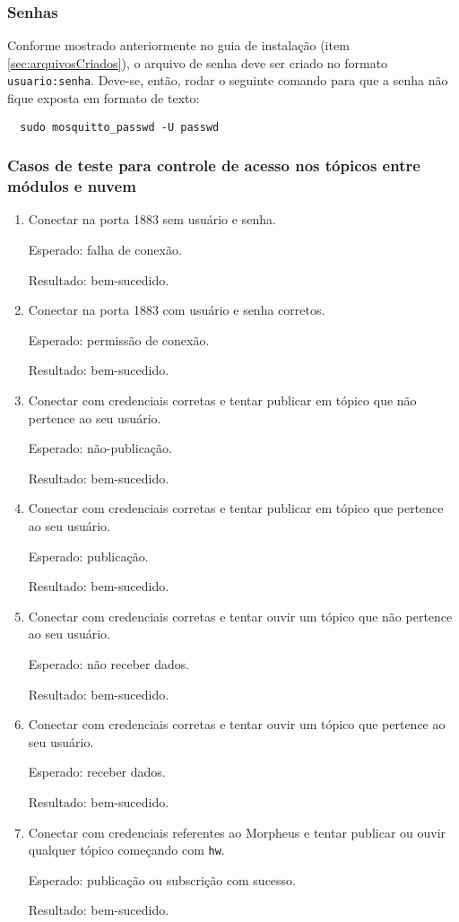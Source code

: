 \subsubsection{Senhas}

Conforme mostrado anteriormente no guia de instalação (item \ref{sec:arquivosCriados}), o arquivo de senha deve ser criado no formato \lstinline{usuario:senha}. Deve-se, então, rodar o seguinte comando para que a senha não fique exposta em formato de texto:

\begin{lstlisting}
  sudo mosquitto_passwd -U passwd
\end{lstlisting}

\subsubsection{Casos de teste para controle de acesso nos tópicos \wmqtt{} entre módulos e nuvem}
\begin{enumerate}
\item
Conectar na porta 1883 sem usuário e senha.

Esperado: falha de conexão.

Resultado: bem-sucedido.
\item Conectar na porta 1883 com usuário e senha corretos.

Esperado: permissão de conexão.

Resultado: bem-sucedido.
\item
Conectar com credenciais corretas e tentar publicar em tópico que não pertence ao seu usuário.

Esperado: não-publicação.

Resultado: bem-sucedido.
\item
Conectar com credenciais corretas e tentar publicar em tópico que pertence ao seu usuário.

Esperado: publicação.

Resultado: bem-sucedido.
\item
Conectar com credenciais corretas e tentar ouvir um tópico que não pertence ao seu usuário.

Esperado: não receber dados.

Resultado: bem-sucedido.
\item
Conectar com credenciais corretas e tentar ouvir um tópico que pertence ao seu usuário.

Esperado: receber dados.

Resultado: bem-sucedido.

\item
Conectar com credenciais referentes ao Morpheus e tentar publicar ou ouvir qualquer tópico começando com \texttt{hw}.

Esperado: publicação ou subscrição com sucesso.

Resultado: bem-sucedido.
\end{enumerate}
